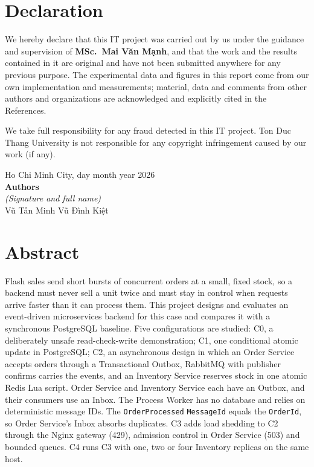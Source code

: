 \documentclass[a4paper]{report}
\newcommand{\vietnamesetext}[1]{{\fontencoding{T5}\fontfamily{ptm}\selectfont #1}}
\begin{document}
\chapter*{Declaration}

We hereby declare that this IT project was carried out by us under the
guidance and supervision of \textbf{MSc.~Mai \vietnamesetext{Văn Mạnh}}, and that the work and
the results contained in it are original and have not been submitted anywhere
for any previous purpose. The experimental data and figures in this report
come from our own implementation and measurements; material, data and comments
from other authors and organizations are acknowledged and explicitly cited in
the References.

We take full responsibility for any fraud detected in this IT project. Ton Duc
Thang University is not responsible for any copyright infringement caused by
our work (if any).

\vspace{3em}
\begin{flushright}
  Ho Chi Minh City, \hspace{1.5em} day \hspace{2em} month \hspace{2em} year 2026\\[1.5em]
  \textbf{Authors}\\
  \textit{(Signature and full name)}\\[5em]
  \vietnamesetext{Vũ Tấn Minh} \hspace{4em} \vietnamesetext{Vũ Đình Kiệt}
\end{flushright}

\chapter*{Abstract}

Flash sales send short bursts of concurrent orders at a small, fixed stock, so
a backend must never sell a unit twice and must stay in control when requests
arrive faster than it can process them. This project designs and evaluates an
event-driven microservices backend for this case and compares it with a
synchronous PostgreSQL baseline. Five configurations are studied: C0, a
deliberately unsafe read-check-write demonstration; C1, one conditional atomic
update in PostgreSQL; C2, an asynchronous design in which an Order Service
accepts orders through a Transactional Outbox, RabbitMQ with publisher
confirms carries the events, and an Inventory Service reserves stock in one
atomic Redis Lua script. Order Service and Inventory Service each have an
Outbox, and their consumers use an Inbox. The Process Worker has no database
and relies on deterministic message IDs. The \texttt{OrderProcessed}
\texttt{MessageId} equals the \texttt{OrderId}, so Order Service's Inbox
absorbs duplicates. C3 adds load shedding to C2 through the Nginx gateway
(429), admission control in Order Service (503) and bounded queues. C4 runs
C3 with one, two or four Inventory replicas on the same host.
\end{document}
